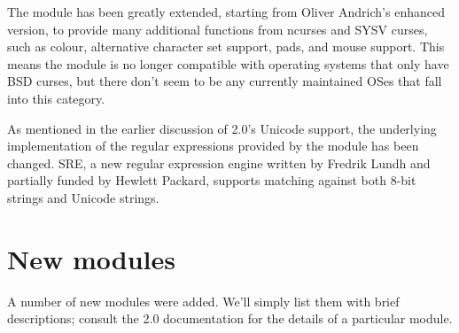 \documentclass{howto}
\begin{document}
The  module has been greatly extended, starting from
Oliver Andrich's enhanced version, to provide many additional
functions from ncurses and SYSV curses, such as colour, alternative
character set support, pads, and mouse support.  This means the module
is no longer compatible with operating systems that only have BSD
curses, but there don't seem to be any currently maintained OSes that
fall into this category.

As mentioned in the earlier discussion of 2.0's Unicode support, the
underlying implementation of the regular expressions provided by the
 module has been changed.  SRE, a new regular expression
engine written by Fredrik Lundh and partially funded by Hewlett
Packard, supports matching against both 8-bit strings and Unicode
strings.

\section{New modules}

A number of new modules were added.  We'll simply list them with brief
descriptions; consult the 2.0 documentation for the details of a
particular module.
\end{document}

